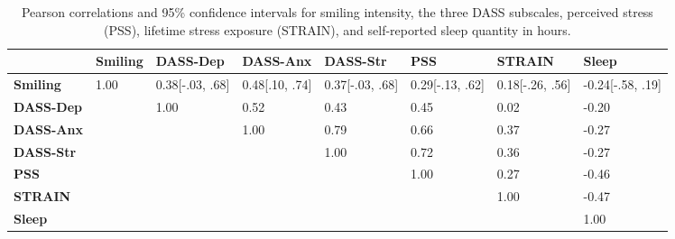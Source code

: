 \documentclass[authordate, empirical,issue]{jote-new-article}
\begin{document}
\begin{table}
  \begin{fullwidth}
    \caption{Pearson correlations and 95\% confidence intervals for smiling intensity, the three DASS subscales, perceived stress (PSS), lifetime stress exposure (STRAIN), and self-reported sleep quantity in hours.}
    \begin{tabularx}{\linewidth}{@{} l l l l l l l l @{}}
      \toprule
                        & \textbf{Smiling} & \textbf{DASS-Dep} & \textbf{DASS-Anx} & \textbf{DASS-Str} & \textbf{PSS}    & \textbf{STRAIN} & \textbf{Sleep} \\
      \midrule

      \textbf{Smiling}  & 1.00             & 0.38[-.03, .68]   & 0.48[.10, .74]    & 0.37[-.03, .68]   & 0.29[-.13, .62]
                        & 0.18[-.26, .56]  & -0.24[-.58, .19]                                                                                               \\

      \textbf{DASS-Dep} &                  & 1.00              & 0.52              & 0.43              & 0.45            & 0.02            & -0.20          \\

      \textbf{DASS-Anx} &                  &                   & 1.00              & 0.79              & 0.66            & 0.37            & -0.27          \\

      \textbf{DASS-Str} &                  &                   &                   & 1.00              & 0.72            & 0.36            & -0.27          \\

      \textbf{PSS}      &                  &                   &                   &                   & 1.00            & 0.27            & -0.46          \\

      \textbf{STRAIN}   &                  &                   &                   &                   &                 & 1.00            & -0.47          \\

      \textbf{Sleep}    &                  &                   &                   &                   &                 &                 & 1.00           \\
    \end{tabularx}
  \end{fullwidth}
\end{table}
\end{document}
